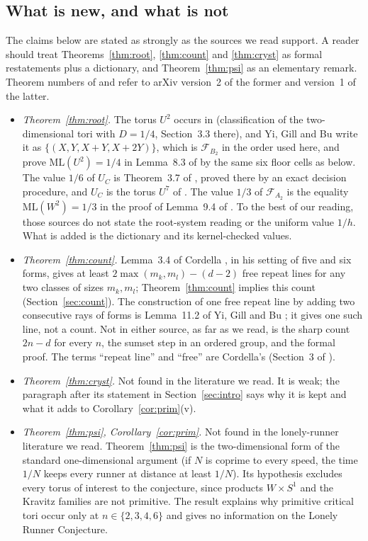 \documentclass[11pt]{amsart}
\theoremstyle{definition}
\theoremstyle{remark}
\newcommand{\ML}{\mathrm{ML}}
\begin{document}
\subsection{What is new, and what is not}
The claims below are stated as strongly as the sources we read support. A reader should treat Theorems~\ref{thm:root}, \ref{thm:count} and \ref{thm:cryst} as formal restatements plus a dictionary, and Theorem~\ref{thm:psi} as an elementary remark. Theorem numbers of \cite{Cordella} and \cite{YGB} refer to arXiv version~2 of the former and version~1 of the latter.
\begin{itemize}[leftmargin=1.5em]
\item \emph{Theorem~\ref{thm:root}.} The torus $U^2$ occurs in \cite{JK} (classification of the two-dimensional tori with $D=1/4$, Section~3.3 there), and Yi, Gill and Bu write it as $\{(X,Y,X+Y,X+2Y)\}$, which is $\mathcal F_{B_2}$ in the order used here, and prove $\ML(U^2)=1/4$ in Lemma~8.3 of \cite{YGB} by the same six floor cells as below. The value $1/6$ of $U_C$ is Theorem~3.7 of \cite{Cordella}, proved there by an exact decision procedure, and $U_C$ is the torus $U^7$ of \cite[Section~6]{JK}. The value $1/3$ of $\mathcal F_{A_2}$ is the equality $\ML(W^2)=1/3$ in the proof of Lemma~9.4 of \cite{YGB}. To the best of our reading, those sources do not state the root-system reading or the uniform value $1/h$. What is added is the dictionary and its kernel-checked values.
\item \emph{Theorem~\ref{thm:count}.} Lemma~3.4 of Cordella \cite{Cordella}, in his setting of five and six forms, gives at least $2\max(m_k,m_l)-(d-2)$ free repeat lines for any two classes of sizes $m_k,m_l$; Theorem~\ref{thm:count} implies this count (Section~\ref{sec:count}). The construction of one free repeat line by adding two consecutive rays of forms is Lemma~11.2 of Yi, Gill and Bu \cite{YGB}; it gives one such line, not a count. Not in either source, as far as we read, is the sharp count $2n-d$ for every $n$, the sumset step in an ordered group, and the formal proof. The terms ``repeat line'' and ``free'' are Cordella's (Section~3 of \cite{Cordella}).
\item \emph{Theorem~\ref{thm:cryst}.} Not found in the literature we read. It is weak; the paragraph after its statement in Section~\ref{sec:intro} says why it is kept and what it adds to Corollary~\ref{cor:prim}(v).
\item \emph{Theorem~\ref{thm:psi}, Corollary~\ref{cor:prim}.} Not found in the lonely-runner literature we read. Theorem~\ref{thm:psi} is the two-dimensional form of the standard one-dimensional argument (if $N$ is coprime to every speed, the time $1/N$ keeps every runner at distance at least $1/N$). Its hypothesis excludes every torus of interest to the conjecture, since products $W\times S^1$ and the Kravitz families are not primitive. The result explains why primitive critical tori occur only at $n\in\{2,3,4,6\}$ and gives no information on the Lonely Runner Conjecture.

\end{itemize}
\end{document}
